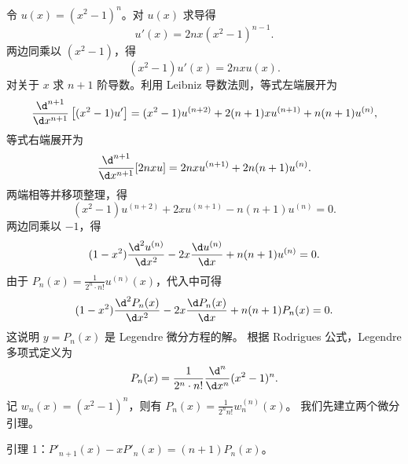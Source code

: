 \begin{myproof}
    令 $u(x) = (x^2 - 1)^n$。对 $u(x)$ 求导得
    \begin{equation}\label{eq:diff-u-8}
        u'(x) = 2nx(x^2 - 1)^{n-1}.
    \end{equation}
    两边同乘以 $(x^2 - 1)$，得
    \begin{equation}\label{eq:diff-eq-u-8}
        (x^2 - 1) u'(x) = 2nx u(x).
    \end{equation}
    对关于 $x$ 求 $n+1$ 阶导数。利用 Leibniz 导数法则，等式左端展开为
    \begin{equation}\label{eq:leibniz-lhs-8}
        \frac{\d^{n+1}}{\d x^{n+1}} \left[ (x^2 - 1) u' \right] = (x^2 - 1) u^{(n+2)} + 2(n+1)x u^{(n+1)} + n(n+1) u^{(n)},
    \end{equation}
    等式右端展开为
    \begin{equation}\label{eq:leibniz-rhs-8}
        \frac{\d^{n+1}}{\d x^{n+1}} [2nx u] = 2nx u^{(n+1)} + 2n(n+1) u^{(n)}.
    \end{equation}
    两端相等并移项整理，得
    \begin{equation}\label{eq:ode-simplify-8}
        (x^2 - 1) u^{(n+2)} + 2x u^{(n+1)} - n(n+1) u^{(n)} = 0.
    \end{equation}
    两边同乘以 $-1$，得
    \begin{equation}\label{eq:ode-final-8}
        (1 - x^2) \frac{\d^2 u^{(n)}}{\d x^2} - 2x \frac{\d u^{(n)}}{\d x} + n(n+1) u^{(n)} = 0.
    \end{equation}
    由于 $P_n(x) = \frac{1}{2^n \cdot n!} u^{(n)}(x)$，代入中可得
    \begin{equation}\label{eq:proof-final-8}
        (1 - x^2) \frac{\d^2 P_n(x)}{\d x^2} - 2x \frac{\d P_n(x)}{\d x} + n(n+1)P_n(x) = 0.
    \end{equation}
    这说明 $y = P_n(x)$ 是 Legendre 微分方程的解。
    根据 Rodrigues 公式，Legendre 多项式定义为
    \begin{equation}\label{eq:rodrigues-def-8}
        P_n(x) = \frac{1}{2^n \cdot n!} \frac{\d^n}{\d x^n} (x^2 - 1)^n.
    \end{equation}
    记 $w_n(x) = (x^2 - 1)^n$，则有 $P_n(x) = \frac{1}{2^n n!} w_n^{(n)}(x)$。
    我们先建立两个微分引理。

    引理 1：$P'_{n+1}(x) - x P'_n(x) = (n+1) P_n(x)$。


\end{myproof}
